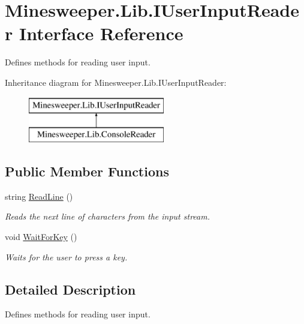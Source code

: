 \hypertarget{interface_minesweeper_1_1_lib_1_1_i_user_input_reader}{\section{Minesweeper.\+Lib.\+I\+User\+Input\+Reader Interface Reference}
\label{interface_minesweeper_1_1_lib_1_1_i_user_input_reader}
}


Defines methods for reading user input.  


Inheritance diagram for Minesweeper.\+Lib.\+I\+User\+Input\+Reader\+:\begin{figure}[H]
\begin{center}
\leavevmode
\includegraphics[height=2.000000cm]{interface_minesweeper_1_1_lib_1_1_i_user_input_reader}
\end{center}
\end{figure}
\subsection*{Public Member Functions}
\begin{DoxyCompactItemize}
\item 
string \hyperlink{interface_minesweeper_1_1_lib_1_1_i_user_input_reader_a58da9817d2e63a510cf833ce7d65f008}{Read\+Line} ()
\begin{DoxyCompactList}\small\item\em Reads the next line of characters from the input stream. \end{DoxyCompactList}\item 
void \hyperlink{interface_minesweeper_1_1_lib_1_1_i_user_input_reader_a54b4a65a7cea8be31dc99a6330be6f51}{Wait\+For\+Key} ()
\begin{DoxyCompactList}\small\item\em Waits for the user to press a key. \end{DoxyCompactList}\end{DoxyCompactItemize}


\subsection{Detailed Description}
Defines methods for reading user input. 



